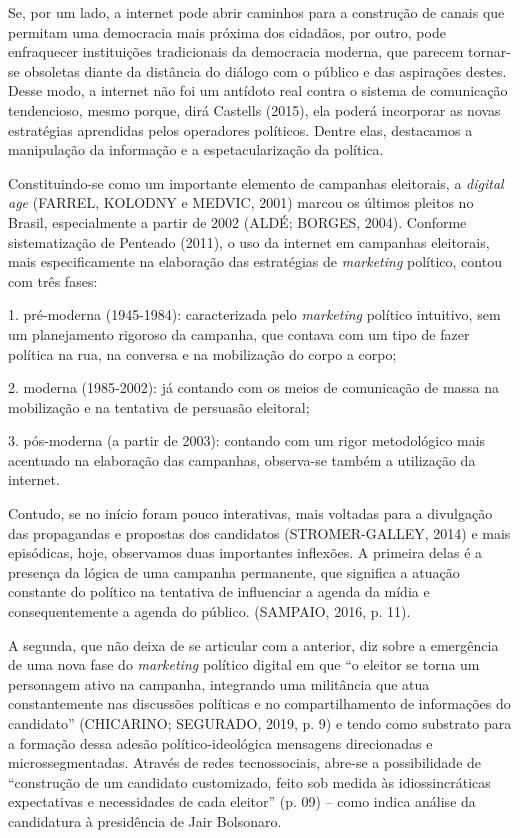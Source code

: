 Se, por um lado, a internet pode abrir caminhos para a construção de
canais que permitam uma democracia mais próxima dos cidadãos, por outro,
pode enfraquecer instituições tradicionais da democracia moderna, que
parecem tornar-se obsoletas diante da distância do diálogo com o público
e das aspirações destes. Desse modo, a internet não foi um antídoto real
contra o sistema de comunicação tendencioso, mesmo porque, dirá Castells
(2015), ela poderá incorporar as novas estratégias aprendidas pelos
operadores políticos. Dentre elas, destacamos a manipulação da
informação e a espetacularização da política.

Constituindo-se como um importante elemento de campanhas eleitorais, a
\emph{digital age} (FARREL, KOLODNY e MEDVIC, 2001) marcou os últimos
pleitos no Brasil, especialmente a partir de 2002 (ALDÉ; BORGES, 2004).
Conforme sistematização de Penteado (2011), o uso da internet em
campanhas eleitorais, mais especificamente na elaboração das estratégias
de \emph{marketing} político, contou com três fases:

1. pré-moderna (1945-1984): caracterizada pelo \emph{marketing} político
intuitivo, sem um planejamento rigoroso da campanha, que contava com um
tipo de fazer política na rua, na conversa e na mobilização do corpo a
corpo;

2. moderna (1985-2002): já contando com os meios de comunicação de massa
na mobilização e na tentativa de persuasão eleitoral;

3. pós-moderna (a partir de 2003): contando com um rigor metodológico
mais acentuado na elaboração das campanhas, observa-se também a
utilização da internet.

Contudo, se no início foram pouco interativas, mais voltadas para a
divulgação das propagandas e propostas dos candidatos (STROMER-GALLEY,
2014) e mais episódicas, hoje, observamos duas importantes inflexões. A
primeira delas é a presença da lógica de uma campanha permanente, que
significa a atuação constante do político na tentativa de influenciar a
agenda da mídia e consequentemente a agenda do público. (SAMPAIO, 2016,
p. 11).

A segunda, que não deixa de se articular com a anterior, diz sobre a
emergência de uma nova fase do \emph{marketing} político digital em que
``o eleitor se torna um personagem ativo na campanha, integrando uma
militância que atua constantemente nas discussões políticas e no
compartilhamento de informações do candidato'' (CHICARINO; SEGURADO,
2019, p. 9) e tendo como substrato para a formação dessa adesão
político-ideológica mensagens direcionadas e microssegmentadas. Através
de redes tecnossociais, abre-se a possibilidade de ``construção de um
candidato customizado, feito sob medida às idiossincráticas expectativas
e necessidades de cada eleitor'' (p. 09) -- como indica análise da
candidatura à presidência de Jair Bolsonaro.

